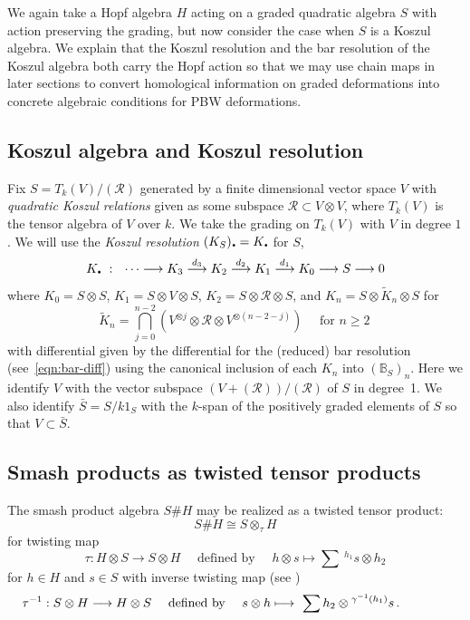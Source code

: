 \documentclass[11pt]{amsart}
\numberwithin{equation}{section}
\newcommand{\igamma}{\gamma^{-1}}
\newcommand{\R}{\mathcal{R}}
\newcommand{\sd}{_{\DOT}}%
\newcommand{\BB}{\mathbb{B}} %
\newcommand{\DOT}{\setlength{\unitlength}{1.2pt}\begin{picture}(2.5,2)
               (1,1)\put(2.5,2.5){\circle*{2}}\end{picture}}
\renewcommand{\_}[1]{\mbox{$_{\left( #1 \right)}$}}
\newcommand{\ot}{\otimes}
\newcommand{\ott}{\otimes_{\tau}}
\newcommand{\Ho}{H}%
\begin{document}
{We again take a Hopf algebra $\Ho$ acting on a graded quadratic
algebra $S$ with action preserving the grading, but now 
consider the case when $S$ is a Koszul algebra.
We explain that the Koszul resolution and the bar resolution of the Koszul
algebra
both carry the Hopf action so that we may use chain maps
in later sections to convert homological information
on graded deformations into concrete algebraic conditions
for PBW deformations.



\subsection*{Koszul algebra and Koszul resolution}
Fix $S = T_k(V)/(\R)$ generated by a finite
dimensional vector space $V$ with
{\em quadratic Koszul relations} given as some subspace
$\R\subset V\ot V$,
where $T_k(V)$ is the tensor algebra of $V$ over $k$.
We take the grading on  $T_k(V)$ with $V$ in degree $1$.
%
We will use the {\em Koszul resolution} $(K_S)\sd=K\sd$ for $S$,
\begin{equation}
  \label{koszulres}
  K\sd\ : \ \ \cdots\longrightarrow K_3\stackrel{d_3}{\longrightarrow}
  K_2 \stackrel{d_2}{\longrightarrow} 
  K_1 \stackrel{d_1}{\longrightarrow}
  K_0 \longrightarrow S\longrightarrow 0
\end{equation}
where $K_0 = S\ot S$, $K_1=S\ot V\ot S$,
$K_2=S\ot \R \ot S$, and 
$K_n=S\ot \tilde K_n\ot S$ for
\begin{equation}\label{Koszulterms}
  \tilde K_n = \bigcap _{j=0}^{n-2} (V^{\ot j}\ot \R 
               \ot V^{\ot (n-2-j)} ) 
               \quad\text{ for } n\geq 2\,
             \end{equation}
with differential given by the differential for the (reduced) bar 
resolution (see~\cref{eqn:bar-diff})
using the canonical inclusion of each 
$K_n$ into $(\BB_S)_n$.
Here
we identify $V$ with the vector subspace $(V+(\R))/(\R)$ of $S$ in
degree~1.
We also identify $\bar S=S/k1_S$ with the $k$-span of the positively
graded
elements of $S$ so that $V\subset \bar S$.
 
\subsection*{Smash products as twisted tensor products}
The smash product algebra
$S\# \Ho$
may be realized as
a twisted tensor product:
$$ S\# \Ho \cong S \ott \Ho $$
for twisting map
$$
\tau: \Ho \ot S \longrightarrow S\ot \Ho
\quad\text{ defined by }\quad
h\ot s \longmapsto \sum\ ^{h_1} s \ot h_2 
$$
for $h\in \Ho$ and $s\in S$ with inverse twisting map (see \cite{TTP-AWEZ})
$$
{}_{}\hspace{-9ex}
\tau^{-1}: S\ot H \longrightarrow H \ot S
\quad\text{ defined by }\quad
s\ot h \longmapsto \ \sum h_2 \ot { ^{\igamma(h_1)} s} \, .
$$



}
\end{document}
